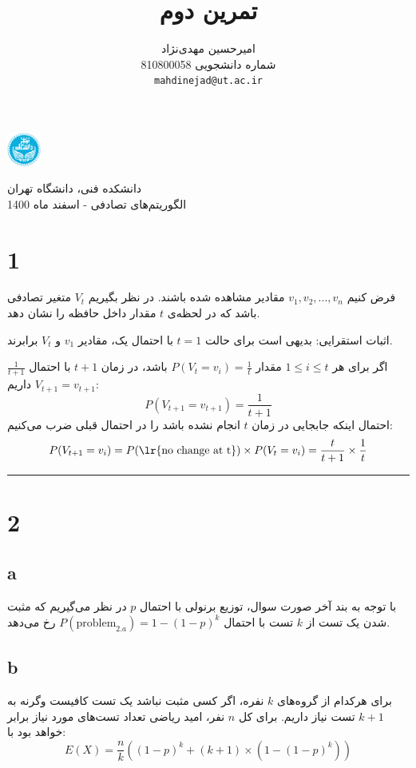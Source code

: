 \documentclass{article}
\title{
تمرین دوم
}
\author{%
  امیرحسین مهدی‌نژاد\\
  شماره دانشجویی 810800058\\
  \texttt{mahdinejad@ut.ac.ir} \\
}
\begin{document}
\begin{minipage}{0.1\textwidth}%
\includegraphics[width=1.1cm]{Photos/UT_logo.png}
\end{minipage}%
\hfill%
\begin{minipage}{0.9\textwidth}\raggedleft
دانشکده فنی، دانشگاه تهران\\
الگوریتم‌های تصادفی -  
اسفند
ماه 1400\\
\end{minipage}

\makepertitle

\section*{1}
فرض کنیم
$v_1, v_2, ..., v_n$
مقادیر مشاهده شده باشند. در نظر بگیریم
$V_t$
متغیر تصادفی باشد که در لحظه‌ی
$t$
مقدار داخل حافظه را نشان دهد.

اثبات استقرایی: بدیهی است برای حالت
$t = 1$
با احتمال یک، مقادیر
$v_1$
و
$V_t$
برابرند.

اگر برای هر
$1 \leq i \leq t$
مقدار
$P(V_t = v_i) = \frac{1}{t}$
باشد، در زمان
$t+1$
با احتمال
$\frac{1}{t+1}$
داریم
$V_{t+1} = v_{t+1}$:
$$ P(V_{t+1} = v_{t+1}) = \frac{1}{t+1} $$
احتمال اینکه جابجایی در زمان 
$t$
انجام نشده باشد را در احتمال قبلی ضرب می‌کنیم:
$$ P(V_{t+1} = v_i) = P(\text{\lr{no change at t}}) \times P(V_t = v_i) = \frac{t}{t+1} \times \frac{1}{t} $$
\rule{\linewidth}{1pt}
\section*{2}
\subsection*{a}
با توجه به بند آخر صورت سوال، توزیع برنولی با احتمال
$p$
در نظر می‌گیریم که مثبت شدن یک تست از
$k$
تست با احتمال
$ P(\text{problem}_{2.a}) = 1 - (1 - p)^k $
رخ می‌دهد.

\subsection*{b}
برای هرکدام از گروه‌های
$k$
نفره، اگر کسی مثبت نباشد یک تست کافیست وگرنه به
$k+1$
تست نیاز داریم. برای کل
$n$
نفر، امید ریاضی تعداد تست‌های مورد نیاز برابر خواهد بود با:
$$E(X) = \frac{n}{k}\left( (1-p)^k + (k+1) \times \left( 1 - (1 - p)^k \right) \right)$$
\end{document}
